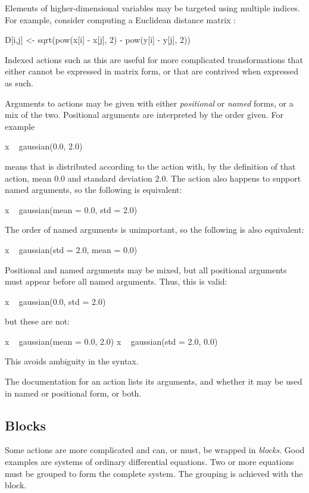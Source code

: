Elements of higher-dimensional variables may be targeted using multiple
indices. For example, consider computing a Euclidean distance matrix :
\begin{bicode}
D[i,j] <- sqrt(pow(x[i] - x[j], 2) - pow(y[i] - y[j], 2))
\end{bicode}
Indexed actions such as this are useful for more complicated transformations
that either cannot be expressed in matrix form, or that are
contrived when expressed as such.

Arguments to actions may be given with either \emph{positional}
 or \emph{named} forms,
or a mix of the two. Positional arguments are interpreted by the order
given. For example
\begin{bicode}
x ~ gaussian(0.0, 2.0)
\end{bicode}
means that  is distributed according to the 
action with, by the definition of that action, mean $0.0$ and standard
deviation $2.0$. The  action also happens to support named
arguments, so the following is equivalent:
\begin{bicode}
x ~ gaussian(mean = 0.0, std = 2.0)
\end{bicode}
The order of named arguments is unimportant, so the following is also
equivalent:
\begin{bicode}
x ~ gaussian(std = 2.0, mean = 0.0)
\end{bicode}

Positional and named arguments may be mixed, but all positional arguments must
appear before all named arguments. Thus, this is valid:
\begin{bicode}
x ~ gaussian(0.0, std = 2.0)
\end{bicode}
but these are not:
\begin{bicode}
x ~ gaussian(mean = 0.0, 2.0)
x ~ gaussian(std = 2.0, 0.0)
\end{bicode}
This avoids ambiguity in the syntax.

The documentation for an action lists its arguments, and whether it may be
used in named or positional form, or both.

\subsection{Blocks}

Some actions are more complicated and can, or must, be wrapped in
\emph{blocks}. Good examples are systems of ordinary differential
equations. Two or more equations must
be grouped to form the complete system. The grouping is achieved with the
 block.

